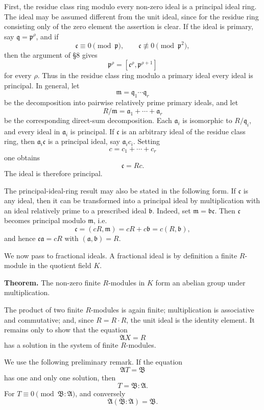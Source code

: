 \documentclass[11pt]{article}
\begin{document}
First, the residue class ring modulo every non-zero ideal is a principal
ideal ring. The ideal may be assumed different from the unit ideal,
since for the residue ring consisting only of the zero element the
assertion is clear. If the ideal is primary, say
\(\mathfrak q=\mathfrak p^{\rho}\), and if \[
  \mathfrak c\equiv0\pmod{\mathfrak p},
  \qquad \mathfrak c\not\equiv0\pmod{\mathfrak p^2},
\] then the argument of §8 gives \[
  \mathfrak p^{\rho}=[\mathfrak c^{\rho},\mathfrak p^{\rho+1}]
\] for every \(\rho\). Thus in the residue class ring modulo a primary
ideal every ideal is principal. In general, let \[
  \mathfrak m=\mathfrak q_1\cdots\mathfrak q_r
\] be the decomposition into pairwise relatively prime primary ideals,
and let \[
  R/\mathfrak m=\mathfrak a_1+\cdots+\mathfrak a_r
\] be the corresponding direct-sum decomposition. Each \(\mathfrak a_i\)
is isomorphic to \(R/\mathfrak q_i\), and every ideal in
\(\mathfrak a_i\) is principal. If \(\mathfrak c\) is an arbitrary ideal
of the residue class ring, then \(\mathfrak a_i\mathfrak c\) is a
principal ideal, say \(\mathfrak a_i c_i\). Setting \[
  c=c_1+\cdots+c_r
\] one obtains \[
  \mathfrak c=Rc.
\] The ideal is therefore principal.

The principal-ideal-ring result may also be stated in the following
form. If \(\mathfrak c\) is any ideal, then it can be transformed into a
principal ideal by multiplication with an ideal relatively prime to a
prescribed ideal \(\mathfrak b\). Indeed, set
\(\mathfrak m=\mathfrak b\mathfrak c\). Then \(\mathfrak c\) becomes
principal modulo \(\mathfrak m\), i.e. \[
  \mathfrak c=(cR,\mathfrak m)=cR+c\mathfrak b=c(R,\mathfrak b),
\] and hence \(\mathfrak c\mathfrak a=cR\) with
\((\mathfrak a,\mathfrak b)=R\).

We now pass to fractional ideals. A fractional ideal is by definition a
finite \(R\)-module in the quotient field \(K\).

\textbf{Theorem.} The non-zero finite \(R\)-modules in \(K\) form an
abelian group under multiplication.

The product of two finite \(R\)-modules is again finite; multiplication
is associative and commutative; and, since \(R=R\cdot R\), the unit
ideal is the identity element. It remains only to show that the equation
\[
  \mathfrak A X=R
\] has a solution in the system of finite \(R\)-modules.

We use the following preliminary remark. If the equation \[
  \mathfrak A T=\mathfrak B
\] has one and only one solution, then \[
  T=\mathfrak B:\mathfrak A.
\] For \(T\equiv0\pmod{\mathfrak B:\mathfrak A}\), and conversely \[
  \mathfrak A(\mathfrak B:\mathfrak A)=\mathfrak B.
\]
\end{document}
